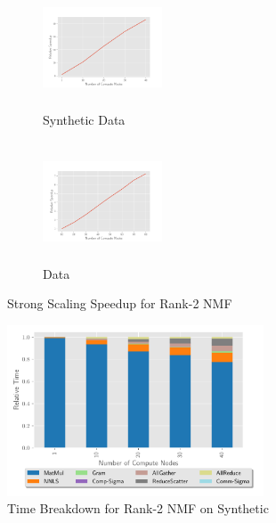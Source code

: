 \begin{figure}
\begin{subfigure}{1.5in}
\begin{center}
\includegraphics[height=1.4in, width=1.4in]{plots/synthetic_rank2_speedup.pdf}
\caption{Synthetic Data}
\label{fig:synrank2speedup}
\end{center}
\end{subfigure}
\begin{subfigure}{1.5in}
\begin{center}
\includegraphics[height=1.4in, width=1.4in]{plots/realworld_rank2_speedup.pdf}
\caption{\image{} Data}
\label{fig:rwrank2speedup}
\end{center}
\end{subfigure}
\caption{Strong Scaling Speedup for Rank-2 NMF }
\label{fig:rank2speedup}
\end{figure}


\begin{figure}
\begin{center}
\includegraphics[height=2in, width=\columnwidth]{plots/synthetic_rank2_strongscaling.pdf}
\caption{Time Breakdown for Rank-2 NMF on Synthetic}
\label{fig:synrank2strongscaling}
\end{center}
\end{figure}

